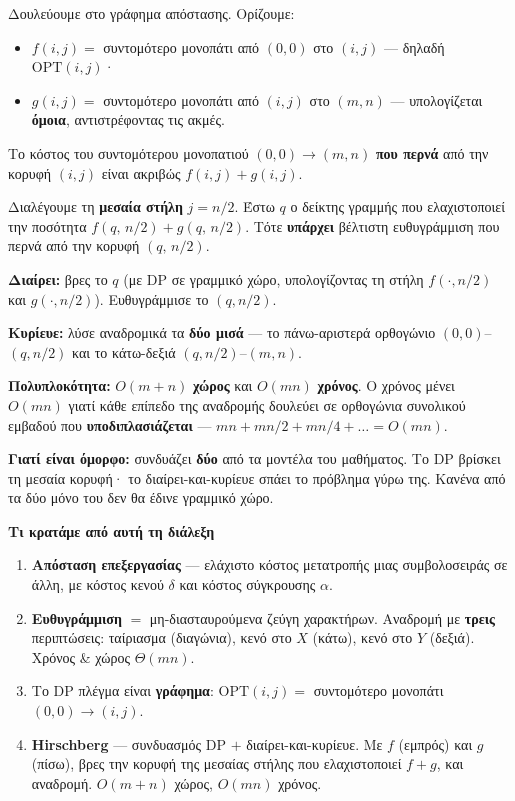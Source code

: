 \documentclass[11pt,a4paper]{article}
\begin{document}
Δουλεύουμε στο γράφημα απόστασης. Ορίζουμε:
\begin{itemize}
  \item $f(i, j) = $ συντομότερο μονοπάτι από $(0, 0)$ στο $(i, j)$ --- δηλαδή
  $\text{OPT}(i, j)$·
  \item $g(i, j) = $ συντομότερο μονοπάτι από $(i, j)$ στο $(m, n)$ ---
  υπολογίζεται \textbf{όμοια}, αντιστρέφοντας τις ακμές.
\end{itemize}

\begin{keypoint}
Το κόστος του συντομότερου μονοπατιού $(0,0) \to (m,n)$ \textbf{που περνά} από
την κορυφή $(i, j)$ είναι ακριβώς $f(i, j) + g(i, j)$.
\end{keypoint}

Διαλέγουμε τη \textbf{μεσαία στήλη} $j = n/2$. Έστω $q$ ο δείκτης γραμμής που
ελαχιστοποιεί την ποσότητα $f(q,\, n/2) + g(q,\, n/2)$. Τότε \textbf{υπάρχει}
βέλτιστη ευθυγράμμιση που περνά από την κορυφή $(q,\, n/2)$.

\textbf{Διαίρει:} βρες το $q$ (με DP σε γραμμικό χώρο, υπολογίζοντας τη στήλη
$f(\cdot, n/2)$ και $g(\cdot, n/2)$). Ευθυγράμμισε το $(q, n/2)$.

\textbf{Κυρίευε:} λύσε αναδρομικά τα \textbf{δύο μισά} --- το πάνω-αριστερά
ορθογώνιο $(0,0)$--$(q, n/2)$ και το κάτω-δεξιά $(q, n/2)$--$(m, n)$.

\begin{keypoint}
\textbf{Πολυπλοκότητα:} $O(m + n)$ \textbf{χώρος} και $O(mn)$ \textbf{χρόνος}. Ο
χρόνος μένει $O(mn)$ γιατί κάθε επίπεδο της αναδρομής δουλεύει σε ορθογώνια
συνολικού εμβαδού που \textbf{υποδιπλασιάζεται} ---
$mn + mn/2 + mn/4 + \dots = O(mn)$.
\end{keypoint}

\begin{intuition}
\textbf{Γιατί είναι όμορφο:} συνδυάζει \textbf{δύο} από τα μοντέλα του
μαθήματος. Το DP βρίσκει τη μεσαία κορυφή· το διαίρει-και-κυρίευε σπάει το
πρόβλημα γύρω της. Κανένα από τα δύο μόνο του δεν θα έδινε γραμμικό χώρο.
\end{intuition}

\begin{recapbox}
\textbf{Τι κρατάμε από αυτή τη διάλεξη}
\begin{enumerate}
  \item \textbf{Απόσταση επεξεργασίας} --- ελάχιστο κόστος μετατροπής μιας
  συμβολοσειράς σε άλλη, με κόστος κενού $\delta$ και κόστος σύγκρουσης $\alpha$.
  \item \textbf{Ευθυγράμμιση} $=$ μη-διασταυρούμενα ζεύγη χαρακτήρων. Αναδρομή με
  \textbf{τρεις} περιπτώσεις: ταίριασμα (διαγώνια), κενό στο $X$ (κάτω), κενό στο
  $Y$ (δεξιά). Χρόνος \& χώρος $\Theta(mn)$.
  \item Το DP πλέγμα είναι \textbf{γράφημα}: $\text{OPT}(i,j) = $ συντομότερο
  μονοπάτι $(0,0) \to (i,j)$.
  \item \textbf{Hirschberg} --- συνδυασμός DP $+$ διαίρει-και-κυρίευε. Με $f$
  (εμπρός) και $g$ (πίσω), βρες την κορυφή της μεσαίας στήλης που ελαχιστοποιεί
  $f + g$, και αναδρομή. $O(m+n)$ χώρος, $O(mn)$ χρόνος.
\end{enumerate}
\end{recapbox}

\lecturefooter
\end{document}
